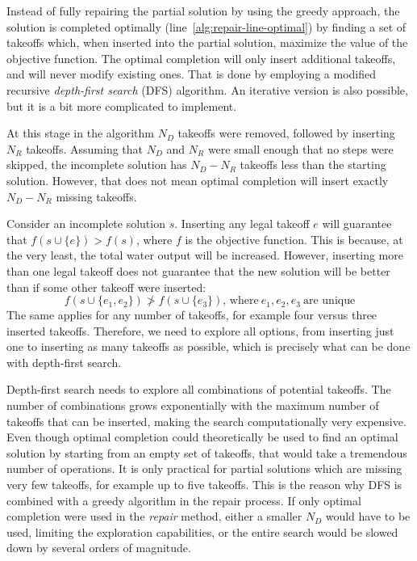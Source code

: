 Instead of fully repairing the partial solution by using the greedy approach, the solution is completed optimally (line~\ref{alg:repair-line-optimal}) by finding a set of takeoffs which, when inserted into the partial solution, maximize the value of the objective function.
The optimal completion will only insert additional takeoffs, and will never modify existing ones.
That is done by employing a modified recursive \textit{depth-first search} (DFS) algorithm.
An iterative version is also possible, but it is a bit more complicated to implement.

At this stage in the algorithm $N_D$ takeoffs were removed, followed by inserting $N_R$ takeoffs.
Assuming that $N_D$ and $N_R$ were small enough that no steps were skipped, the incomplete solution has $N_D - N_R$ takeoffs less than the starting solution.
However, that does not mean optimal completion will insert exactly $N_D - N_R$ missing takeoffs.

Consider an incomplete solution $s$.
Inserting any legal takeoff $e$ will guarantee that $f(s \cup \{ e \}) > f(s)$, where $f$ is the objective function.
This is because, at the very least, the total water output will be increased.
However, inserting more than one legal takeoff does not guarantee that the new solution will be better than if some other takeoff were inserted:
\begin{equation}
    f(s \cup \{ e_1, e_2 \}) \not> f(s \cup \{ e_3 \}), \, \text{where}~e_1, e_2, e_3~\text{are unique}
\end{equation}
The same applies for any number of takeoffs, for example four versus three inserted takeoffs.
Therefore, we need to explore all options, from inserting just one to inserting as many takeoffs as possible, which is precisely what can be done with depth-first search.

Depth-first search needs to explore all combinations of potential takeoffs.
The number of combinations grows exponentially with the maximum number of takeoffs that can be inserted, making the search computationally very expensive.
Even though optimal completion could theoretically be used to find an optimal solution by starting from an empty set of takeoffs, that would take a tremendous number of operations.
It is only practical for partial solutions which are missing very few takeoffs, for example up to five takeoffs.
This is the reason why DFS is combined with a greedy algorithm in the repair process.
If only optimal completion were used in the \textit{repair} method, either a smaller $N_D$ would have to be used, limiting the exploration capabilities, or the entire search would be slowed down by several orders of magnitude.

